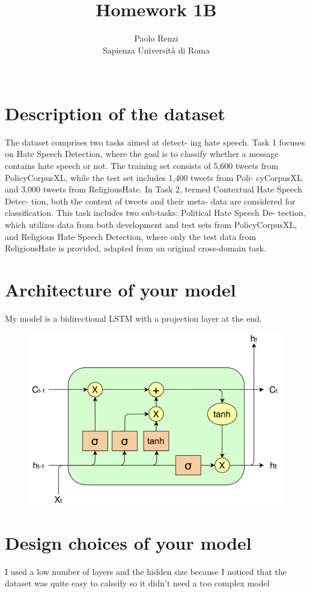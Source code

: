 \documentclass[11pt]{article}
\title{Homework 1B}
\author{Paolo Renzi \\
  Sapienza Università di Roma\\\
  }
\begin{document}
\maketitle

\section{Description of the dataset}
The dataset comprises two tasks aimed at detect-
ing hate speech. Task 1 focuses on Hate Speech
Detection, where the goal is to classify whether a
message contains hate speech or not. The training
set consists of 5,600 tweets from PolicyCorpusXL,
while the test set includes 1,400 tweets from Poli-
cyCorpusXL and 3,000 tweets from ReligiousHate.
In Task 2, termed Contextual Hate Speech Detec-
tion, both the content of tweets and their meta-
data are considered for classification. This task
includes two sub-tasks: Political Hate Speech De-
tection, which utilizes data from both development
and test sets from PolicyCorpusXL, and Religious
Hate Speech Detection, where only the test data
from ReligiousHate is provided, adapted from an
original cross-domain task.

\section{Architecture of your model}
My model is a bidirectional LSTM with a projection layer at the end.

\begin{figure}[!htb]
  \includegraphics[width=\columnwidth]{LSTM.png}
  \label{fig:LSTM}
\end{figure}

\section{Design choices of your model}
I used a low number of layers and the hidden size because I noticed that the dataset was quite easy to calssify so it didn't need a too complex model
\end{document}
